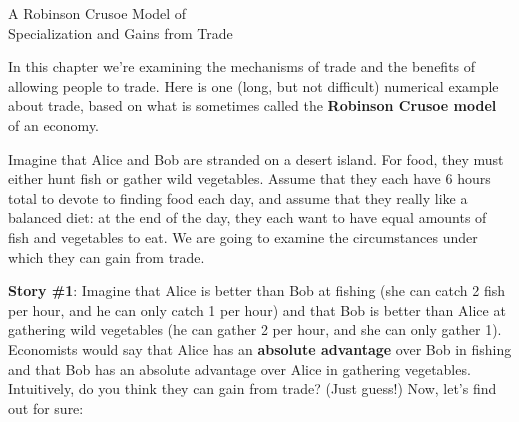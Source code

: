 \documentclass{article}
\begin{document}
\begin{center}
{\Large A Robinson Crusoe Model of \\[.05in]Specialization and Gains from Trade}
\end{center}


\bigskip

\noindent In this chapter we're examining the mechanisms of trade and the benefits of allowing people to trade. Here is one (long, but not difficult) numerical example about trade, based on what is sometimes called the \textbf{Robinson Crusoe model} of an economy.

Imagine that Alice and Bob are stranded on a desert island. For food, they must either hunt fish or gather wild vegetables. Assume that they each have 6 hours total to devote to finding food each day, and assume that they really like a balanced diet: at the end of the day, they each want to have equal amounts of fish and vegetables to eat. We are going to examine the circumstances under which they can gain from trade.

\bigskip

\noindent \textbf{Story \#1}: Imagine that Alice is better than Bob at fishing (she can catch 2 fish per hour, and he can only catch 1 per hour) and that Bob is better than Alice at gathering wild vegetables (he can gather 2 per hour, and she can only gather 1). Economists would say that Alice has an \textbf{absolute advantage} over Bob in fishing and that Bob has an absolute advantage over Alice in gathering vegetables. Intuitively, do you think they can gain from trade?  %
(Just guess!) Now, let's find out for sure:
\end{document}
